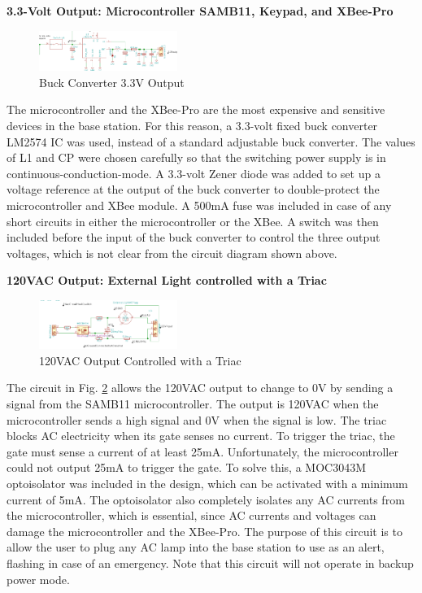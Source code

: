\documentclass[journal,compsoc]{IEEEtran}
\begin{document}
\textbf {3.3-Volt Output: Microcontroller SAMB11, Keypad, and XBee-Pro}

\begin{figure}[ht]	%
\centering
\includegraphics[width=0.4\textwidth]{Buck.png}
\caption{ Buck Converter 3.3V Output }
\label{PConverter}
\end{figure}

The microcontroller and the XBee-Pro are the most expensive and sensitive devices in the base station. For this reason, a 3.3-volt fixed buck converter LM2574 IC was used, instead of a standard adjustable buck converter.  The values of L1 and CP were chosen carefully so that the switching power supply is in continuous-conduction-mode.  A 3.3-volt Zener diode was added to set up a voltage reference at the output of the buck converter to double-protect the microcontroller and XBee module.  A 500mA fuse was included in case of any short circuits in either the microcontroller or the XBee.  A switch was then included before the input of the buck converter to control the three output voltages, which is not clear from the circuit diagram shown above.

\textbf {120VAC Output: External Light controlled with a Triac}

\begin{figure}[ht]	%
\centering
\includegraphics[width=0.4\textwidth]{Triac.png}
\caption{ 120VAC Output Controlled with a Triac}
\label{PTriac}
\end{figure}

The circuit in Fig. \ref{PTriac} allows the 120VAC output to change to 0V by sending a signal from the SAMB11 microcontroller.  The output is 120VAC when the microcontroller sends a high signal and 0V when the signal is low.  The triac blocks AC electricity when its gate senses no current.  To trigger the triac, the gate must sense a current of at least 25mA.  Unfortunately, the microcontroller could not output 25mA to trigger the gate.  To solve this, a MOC3043M optoisolator was included in the design, which can be activated with a minimum current of 5mA.  The optoisolator also completely isolates any AC currents from the microcontroller, which is essential, since AC currents and voltages can damage the microcontroller and the XBee-Pro.  The purpose of this circuit is to allow the user to plug any AC lamp into the base station to use as an alert, flashing in case of an emergency.  Note that this circuit will not operate in backup power mode.
\end{document}

